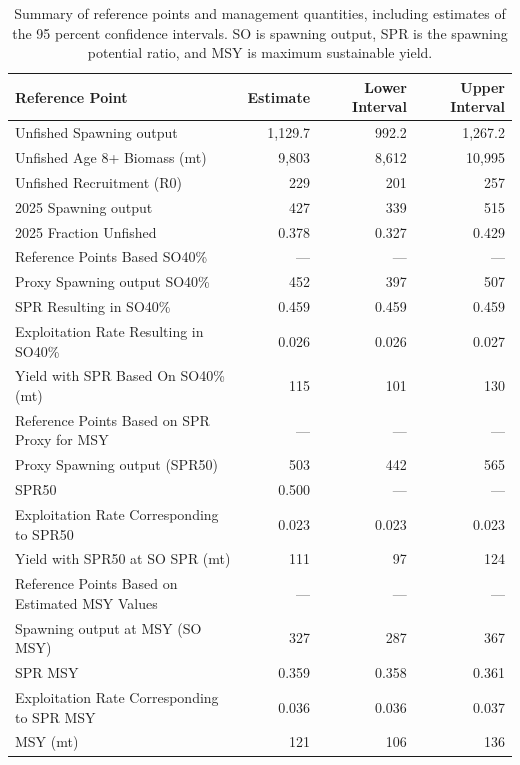 \documentclass[
]{scrartcl}
\begin{document}
\begin{longtable}{lrrr}

\caption{\label{tbl-ref-points-es}Summary of reference points and
management quantities, including estimates of the 95 percent confidence
intervals. SO is spawning output, SPR is the spawning potential ratio,
and MSY is maximum sustainable yield.}

\tabularnewline

\toprule
Reference Point & Estimate & Lower Interval & Upper Interval \\ 
\midrule\addlinespace[2.5pt]
Unfished Spawning output & 1,129.7 & 992.2 & 1,267.2 \\ 
Unfished Age 8+ Biomass (mt) & 9,803 & 8,612 & 10,995 \\ 
Unfished Recruitment (R0) & 229 & 201 & 257 \\ 
2025 Spawning output & 427 & 339 & 515 \\ 
2025 Fraction Unfished & 0.378 & 0.327 & 0.429 \\ 
Reference Points Based SO40\% & — & — & — \\ 
Proxy Spawning output SO40\% & 452 & 397 & 507 \\ 
SPR Resulting in SO40\% & 0.459 & 0.459 & 0.459 \\ 
Exploitation Rate Resulting in SO40\% & 0.026 & 0.026 & 0.027 \\ 
Yield with SPR Based On SO40\% (mt) & 115 & 101 & 130 \\ 
Reference Points Based on SPR Proxy for MSY & — & — & — \\ 
Proxy Spawning output (SPR50) & 503 & 442 & 565 \\ 
SPR50 & 0.500 & — & — \\ 
Exploitation Rate Corresponding to SPR50 & 0.023 & 0.023 & 0.023 \\ 
Yield with SPR50 at SO SPR (mt) & 111 & 97 & 124 \\ 
Reference Points Based on Estimated MSY Values & — & — & — \\ 
Spawning output at MSY (SO MSY) & 327 & 287 & 367 \\ 
SPR MSY & 0.359 & 0.358 & 0.361 \\ 
Exploitation Rate Corresponding to SPR MSY & 0.036 & 0.036 & 0.037 \\ 
MSY (mt) & 121 & 106 & 136 \\ 
\bottomrule

\end{longtable}

\endgroup
\end{document}
